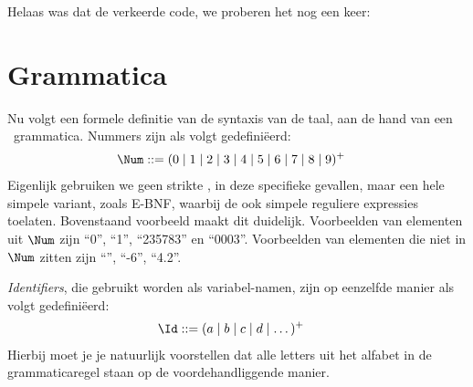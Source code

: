 Helaas was dat de verkeerde code, we proberen het nog een keer:



\section{Grammatica}

Nu volgt een formele definitie van de syntaxis van de taal, aan de hand van een \BNF\ grammatica. Nummers zijn als volgt gedefiniëerd:
\begin{align*}
  \Num \GrammarDef (0 \mid 1 \mid 2 \mid 3 \mid 4 \mid 5 \mid 6 \mid 7 \mid 8 \mid 9)^+
\end{align*}
Eigenlijk gebruiken we geen strikte \BNF, in deze specifieke gevallen, maar een hele simpele variant, zoals \textsc{E-BNF}, waarbij de ook simpele reguliere expressies toelaten.%
Bovenstaand voorbeeld maakt dit duidelijk. Voorbeelden van elementen uit $\Num$ zijn ``0'', ``1'', ``235783'' en ``0003''. Voorbeelden van elementen die niet in $\Num$ zitten zijn ``'', ``-6'', ``4.2''.

\emph{Identifiers}, die gebruikt worden als variabel-namen,%
zijn op eenzelfde manier als volgt gedefiniëerd:
\begin{align*}
  \Id \GrammarDef (a \mid b \mid c \mid d \mid \dots)^+
\end{align*}
Hierbij moet je je natuurlijk%
voorstellen dat alle letters uit het alfabet in de grammaticaregel staan op de voordehandliggende%
manier.

